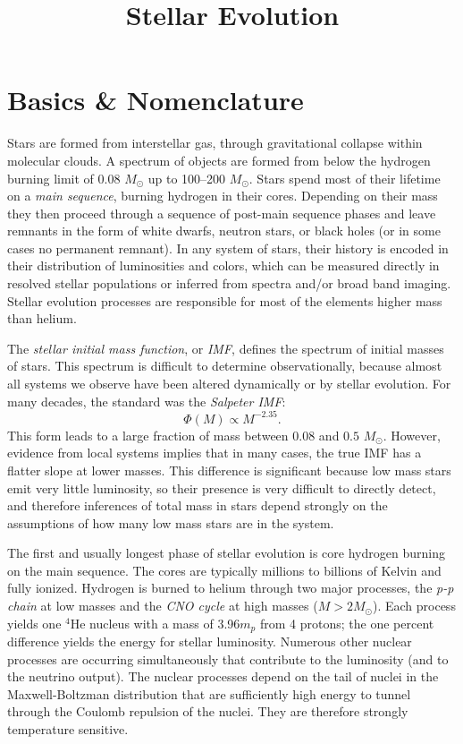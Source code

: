 \title{\bf Stellar Evolution}

\section{Basics \& Nomenclature}

Stars are formed from interstellar gas, through gravitational collapse
within molecular clouds. A spectrum of objects are formed from below
the hydrogen burning limit of 0.08 $M_\odot$ up to 100--200
$M_\odot$. Stars spend most of their lifetime on a {\it main
sequence}, burning hydrogen in their cores. Depending on their mass
they then proceed through a sequence of post-main sequence phases and
leave remnants in the form of white dwarfs, neutron stars, or black
holes (or in some cases no permanent remnant). In any system of stars,
their history is encoded in their distribution of luminosities and
colors, which can be measured directly in resolved stellar populations
or inferred from spectra and/or broad band imaging. Stellar evolution
processes are responsible for most of the elements higher mass than
helium.

The {\it stellar initial mass function}, or {\it IMF}, defines the
spectrum of initial masses of stars. This spectrum is difficult to
determine observationally, because almost all systems we observe have
been altered dynamically or by stellar evolution. For many decades,
the standard was the {\it Salpeter IMF}:
\begin{equation}
\Phi(M) \propto M^{-2.35}.
\end{equation}
This form leads to a large fraction of mass between $0.08$ and $0.5$
$M_\odot$. However, evidence from local systems implies that in many
cases, the true IMF has a flatter slope at lower masses. This
difference is significant because low mass stars emit very little
luminosity, so their presence is very difficult to directly detect,
and therefore inferences of total mass in stars depend strongly on the
assumptions of how many low mass stars are in the system.

The first and usually longest phase of stellar evolution is core
hydrogen burning on the main sequence. The cores are typically
millions to billions of Kelvin and fully ionized. Hydrogen is burned
to helium through two major processes, the {\it p-p chain} at low
masses and the {\it CNO cycle} at high masses ($M>2 M_\odot$). Each
process yields one ${}^4$He nucleus with a mass of 3.96$m_p$ from 4
protons; the one percent difference yields the energy for stellar
luminosity. Numerous other nuclear processes are occurring
simultaneously that contribute to the luminosity (and to the neutrino
output). The nuclear processes depend on the tail of nuclei in the
Maxwell-Boltzman distribution that are sufficiently high energy to
tunnel through the Coulomb repulsion of the nuclei. They are therefore
strongly temperature sensitive.

